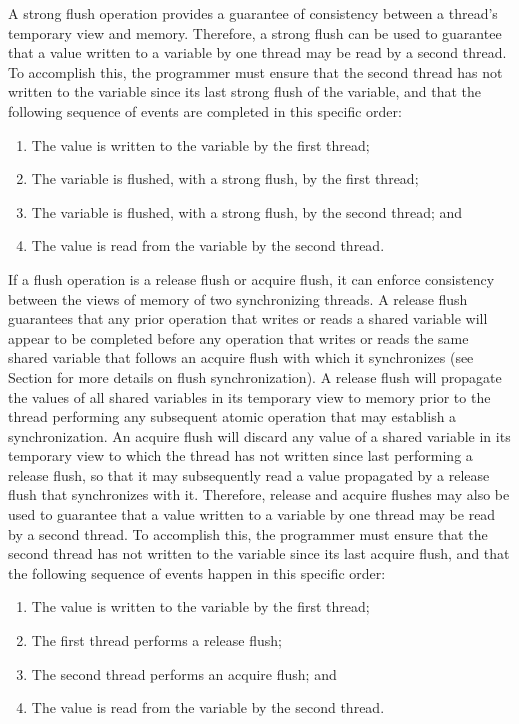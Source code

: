 A strong flush operation provides a guarantee of consistency between a thread’s
temporary view and memory. Therefore, a strong flush can be used to
guarantee that a value written to a variable by one thread may be read by a
second thread. To accomplish this, the programmer must ensure that the second
thread has not written to the variable since its last strong flush of the
variable, and that the following sequence of events are completed in this 
specific order:

\begin{enumerate}
    \item The value is written to the variable by the first thread;
    \item The variable is flushed, with a strong flush, by the first thread;
    \item The variable is flushed, with a strong flush, by the second thread; and
    \item The value is read from the variable by the second thread.
\end{enumerate}

If a flush operation is a release flush or acquire flush, it can enforce
consistency between the views of memory of two synchronizing threads.  A release
flush guarantees that any prior operation that writes or reads a shared
variable will appear to be completed before any operation that writes or reads
the same shared variable that follows an acquire flush with which it
synchronizes (see Section  for more details on
flush synchronization).  A release flush will propagate the values of all
shared variables in its temporary view to memory prior to the thread
performing any subsequent atomic operation that may establish a
synchronization. An acquire flush will discard any value of a shared variable
in its temporary view to which the thread has not written since last performing
a release flush, so that it may subsequently read a value propagated by a
release flush that synchronizes with it.   Therefore, release and acquire
flushes may also be used to guarantee that a value written to a variable by
one thread may be read by a second thread. To accomplish this, the programmer
must ensure that the second thread has not written to the variable since its
last acquire flush, and that the following sequence of events happen in this
specific order:

\begin{enumerate}
    \item The value is written to the variable by the first thread;
    \item The first thread performs a release flush;
    \item The second thread performs an acquire flush; and
    \item The value is read from the variable by the second thread.
\end{enumerate}

